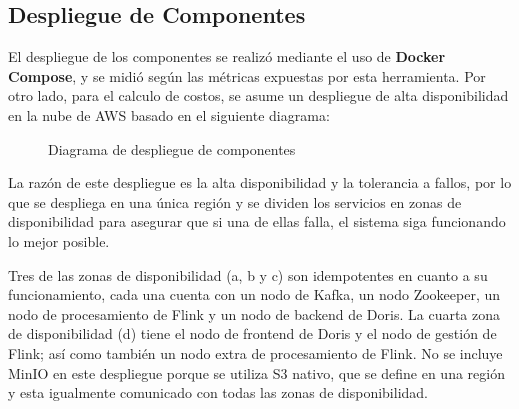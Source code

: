 \clearpage

\subsection{Despliegue de Componentes}

El despliegue de los componentes se realizó mediante el uso de \textbf{Docker Compose}, y se midió según las métricas expuestas por esta herramienta.
Por otro lado, para el calculo de costos, se asume un despliegue de alta disponibilidad en la nube de AWS basado en el siguiente diagrama:

\begin{figure}[h]
    \caption{Diagrama de despliegue de componentes}
    \label{fig:infraestructura}
\end{figure}

\clearpage

La razón de este despliegue es la alta disponibilidad y la tolerancia a fallos, por lo que se despliega en una única región 
y se dividen los servicios en zonas de disponibilidad para asegurar que si una de ellas falla,
el sistema siga funcionando lo mejor posible.\newline

Tres de las zonas de disponibilidad (a, b y c) son idempotentes en cuanto a su funcionamiento, 
cada una cuenta con un nodo de Kafka, un nodo Zookeeper, un nodo de procesamiento de Flink y un nodo de backend de Doris.
La cuarta zona de disponibilidad (d) tiene el nodo de frontend de Doris y el nodo de gestión de Flink; así como también un nodo extra de procesamiento de Flink.
No se incluye MinIO en este despliegue porque se utiliza S3 nativo, que se define en una región y esta igualmente comunicado con todas las zonas de disponibilidad.\newline

